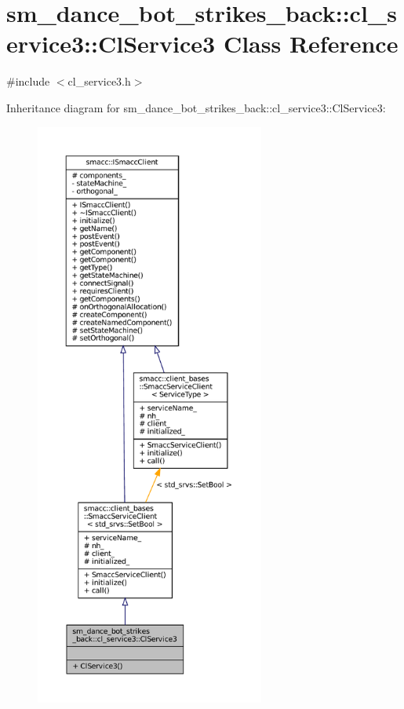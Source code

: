 \hypertarget{classsm__dance__bot__strikes__back_1_1cl__service3_1_1ClService3}{}\section{sm\+\_\+dance\+\_\+bot\+\_\+strikes\+\_\+back\+:\+:cl\+\_\+service3\+:\+:Cl\+Service3 Class Reference}
\label{classsm__dance__bot__strikes__back_1_1cl__service3_1_1ClService3}


{\ttfamily \#include $<$cl\+\_\+service3.\+h$>$}



Inheritance diagram for sm\+\_\+dance\+\_\+bot\+\_\+strikes\+\_\+back\+:\+:cl\+\_\+service3\+:\+:Cl\+Service3\+:
\nopagebreak
\begin{figure}[H]
\begin{center}
\leavevmode
\includegraphics[height=550pt]{classsm__dance__bot__strikes__back_1_1cl__service3_1_1ClService3__inherit__graph}
\end{center}
\end{figure}


